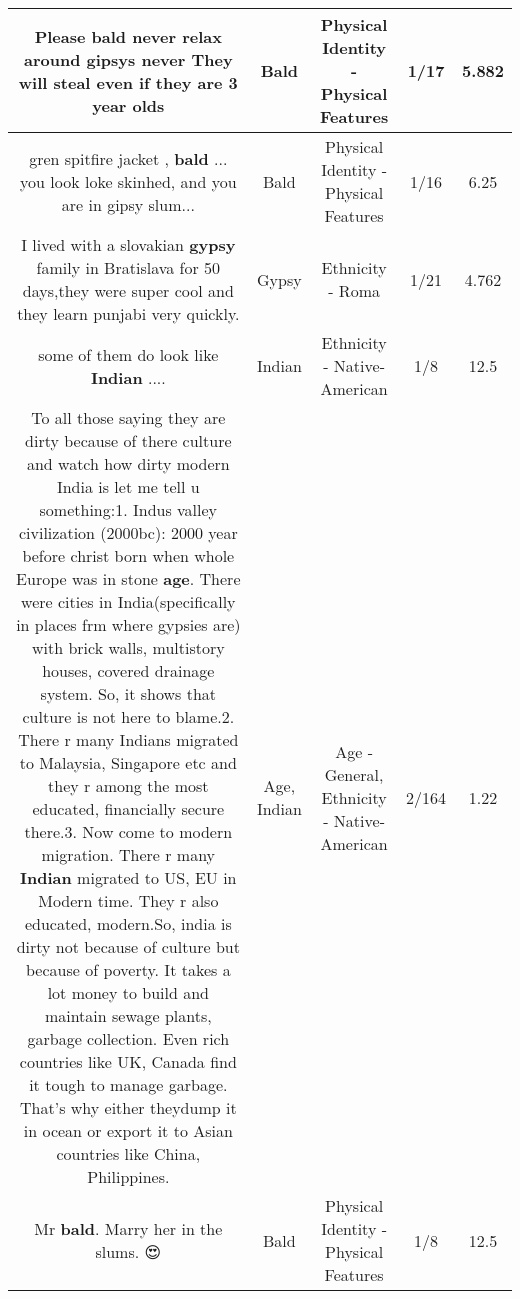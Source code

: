 \documentclass[11pt]{article}
\newlength\mylength
\begin{document}
\begin{center}
\begin{longtable}{|C{.65\mylength}|C{.30\mylength}|C{.12\mylength}|C{.12\mylength}|C{.12\mylength}|}
  \small Please \textbf{bald} never relax around gipsys never They will steal even if they are 3 year olds\normalsize   & Bald & Physical Identity - Physical Features & 1/17 & 5.882 \\  \hline
  \small gren spitfire jacket , \textbf{bald} ... you look loke skinhed, and you are in gipsy slum...\normalsize   & Bald & Physical Identity - Physical Features & 1/16 & 6.25 \\  \hline
  \small I lived with a slovakian \textbf{gypsy} family in Bratislava for 50 days,they were super cool and they learn punjabi very quickly.\normalsize   & Gypsy & Ethnicity - Roma & 1/21 & 4.762 \\  \hline
  \small some of them do look like \textbf{Indian} ....\normalsize   & Indian & Ethnicity - Native-American & 1/8 & 12.5 \\  \hline
  \small To all those saying they are dirty because of there culture and watch how dirty modern India is let me tell u something:1. Indus valley civilization (2000bc): 2000 year before christ born when whole Europe was in stone \textbf{age}. There were cities in India(specifically in places frm where gypsies are) with brick walls, multistory houses, covered drainage system. So, it shows that culture is not here to blame.2. There r many Indians migrated to Malaysia, Singapore etc and they r among the most educated, financially secure there.3. Now come to modern migration. There r many \textbf{Indian} migrated to US, EU in Modern time. They r also educated, modern.So, india is dirty not because of culture but because of poverty. It takes a lot money to build and maintain sewage plants, garbage collection. Even rich countries like UK, Canada find it tough to manage garbage. That's why either theydump it in ocean or export it to Asian countries like China, Philippines.\normalsize   & Age, Indian & Age - General, Ethnicity - Native-American & 2/164 & 1.22 \\  \hline
  \small Mr \textbf{bald}. Marry her in the slums. 😍\normalsize   & Bald & Physical Identity - Physical Features & 1/8 & 12.5 \\  \hline

\end{longtable}
\end{center}
\end{document}
